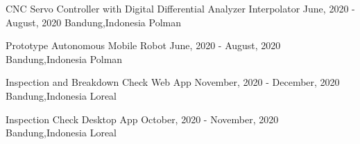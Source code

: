 \begin{cvhonors}
  \cvhonor
    {CNC Servo Controller with Digital Differential Analyzer Interpolator} %
    {June, 2020 - August, 2020} %
    {Bandung,Indonesia} %
    {Polman} %

  \cvhonor
    {Prototype Autonomous Mobile Robot} %
    {June, 2020 - August, 2020} %
    {Bandung,Indonesia} %
    {Polman} %

  \cvhonor
    {Inspection and Breakdown Check Web App} %
    {November, 2020 - December, 2020} %
    {Bandung,Indonesia} %
    {Loreal} %

  \cvhonor
    {Inspection Check Desktop App} %
    {October, 2020 - November, 2020} %
    {Bandung,Indonesia} %
    {Loreal} %

\end{cvhonors}
